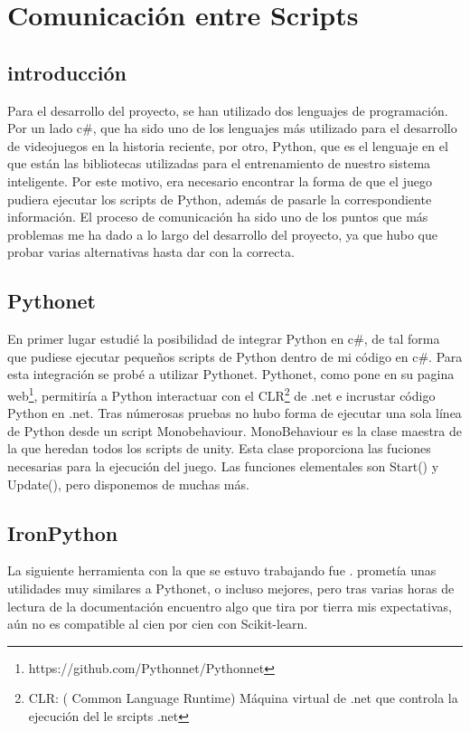 \section{Comunicación entre Scripts}

\subsection{introducción}
Para el desarrollo del proyecto, se han utilizado dos lenguajes de programación. Por un lado c\#, que ha sido uno de los lenguajes más utilizado para el desarrollo de videojuegos en la historia reciente, por otro, Python, que es el lenguaje en el que están las bibliotecas utilizadas para el entrenamiento de nuestro sistema inteligente. Por este motivo, era necesario encontrar la forma de que el juego pudiera ejecutar los scripts de Python, además de pasarle la correspondiente información. El proceso de comunicación ha sido uno de los puntos que más problemas me ha dado a lo largo del desarrollo del proyecto, ya que hubo que probar varias alternativas hasta dar con la correcta.

\subsection{Pythonet}
En primer lugar estudié la posibilidad de integrar Python en c\#, de tal forma que pudiese ejecutar pequeños scripts de Python dentro de mi código en c\#. Para esta integración se probé a utilizar Pythonet. Pythonet, como pone en su pagina web\footnote{https://github.com/Pythonnet/Pythonnet}, permitiría a Python interactuar con el CLR\footnote{CLR: ( Common Language Runtime) Máquina virtual de .net que controla la ejecución del le srcipts .net} de .net e incrustar código Python en .net. Tras númerosas pruebas no hubo forma de ejecutar una sola línea de Python desde un script Monobehaviour. MonoBehaviour es la clase maestra de la que heredan todos los scripts de unity. Esta clase proporciona las fuciones necesarias para la ejecución del juego. Las funciones elementales son Start() y Update(), pero disponemos de muchas más. 


\subsection{IronPython}
La siguiente herramienta con la que se estuvo trabajando fue .  prometía unas utilidades muy similares a Pythonet, o incluso mejores, pero tras varias horas de lectura de la documentación encuentro algo que tira por tierra mis expectativas,  aún no es compatible al cien por cien con Scikit-learn.


